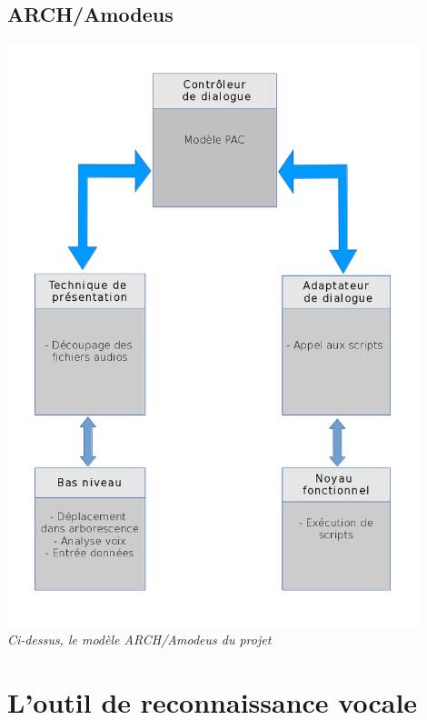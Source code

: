 \documentclass[a4paper, 11pt]{report}
\begin{document}
			
		\section{ARCH/Amodeus}
		
		\begin{center}
			\includegraphics[width=12cm]{nimp}\\
			\emph{Ci-dessus, le modèle ARCH/Amodeus du projet}
		\end{center}
			
		
	
	\chapter{L'outil de reconnaissance vocale}
	
\end{document}
